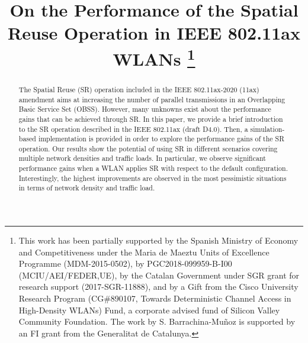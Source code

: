 \documentclass[conference]{IEEEtran}
\begin{document}
	
	\title{On the Performance of the Spatial Reuse Operation in IEEE 802.11ax WLANs
		\thanks{This  work  has  been  partially  supported  by  the Spanish Ministry of Economy and Competitiveness under the Maria de Maeztu  Units  of  Excellence  Programme (MDM-2015-0502), by PGC2018-099959-B-I00 (MCIU/AEI/FEDER,UE), by the Catalan Government under SGR grant for research support (2017-SGR-11888),  and  by a Gift from the Cisco University Research Program (CG\#890107, Towards Deterministic Channel Access in High-Density WLANs) Fund, a corporate advised fund of Silicon Valley Community Foundation. The work by S. Barrachina-Mu\~noz is supported by an FI grant from the Generalitat de Catalunya.}}
	
	\author{
		\and
		\and
	}
	
	\maketitle
	
	\begin{abstract}
	The Spatial Reuse (SR) operation included in the IEEE 802.11ax-2020 (11ax) amendment aims at increasing the number of parallel transmissions in an Overlapping Basic Service Set (OBSS). However, many unknowns exist about the performance gains that can be achieved through SR. In this paper, we provide a brief introduction to the SR operation described in the IEEE 802.11ax (draft D4.0). Then, a simulation-based implementation is provided in order to explore the performance gains of the SR operation. Our results show the potential of using SR in different scenarios covering multiple network densities and traffic loads. In particular, we observe significant performance gains when a WLAN applies SR with respect to the default configuration. Interestingly, the highest improvements are observed in the most pessimistic situations in terms of network density and traffic load.
	\end{abstract}
	
\end{document}
